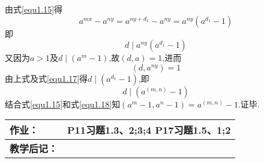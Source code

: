 由式\eqref{equ1.15}得
\begin{equation*}
	a^{m x}-a^{n y}=a^{n y+d_{1}}-a^{n y}=a^{n y}\left(a^{d_{1}}-1\right)
\end{equation*}
即
\begin{equation}\label{equ1.17}
	d \mid a^{n y}\left(a^{d_{1}}-1\right)
\end{equation}
又因为$a>1$及$d \mid\left(a^{m}-1\right)$,故$(d, a)=1$,进而
\begin{equation*}
	\left(d, a^{n y}\right)=1
\end{equation*}
由上式及式\eqref{equ1.17}得$d \mid\left(a^{d_{1}}-1\right)$,即
\begin{equation}\label{equ1.18}
	d \mid\left(a^{(m, n)}-1\right)
\end{equation}
结合式\eqref{equ1.15}和式\eqref{equ1.18}知$\left(a^{m}-1, a^{n}-1\right)=a^{(m, n)}-1$.证毕.

\begin{table}[htb]
	\centering  
	\begin{tabular}{p{22mm}|p{105.6mm}}
		\hline 
		\textbf{作业：}      & P11习题1.3、2;3;4 \quad P17习题1.5、1;2  \\ \hline
		\textbf{教学后记：}  & \vspace{4ex} \\ \hline
	\end{tabular}
\end{table}
